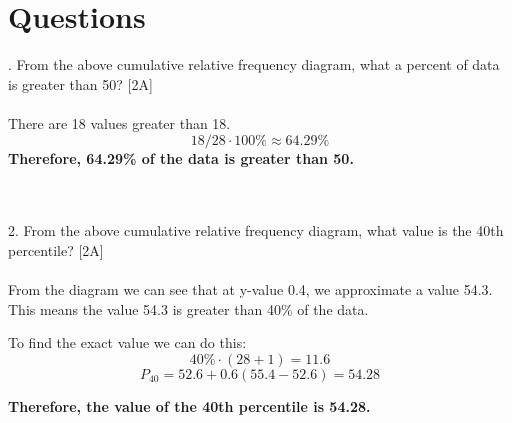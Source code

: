 \documentclass{article}
\begin{document}
\section{Questions}
. From the above cumulative relative frequency diagram, what a percent of data is greater than 50? [2A]
\\
\\
There are 18 values greater than 18.
\[18/28 \cdot 100\% \approx 64.29\%\]
\textbf{Therefore, 64.29\% of the data is greater than 50.}

\\
\\
2. From the above cumulative relative frequency diagram, what value is the 40th percentile?  [2A]
\\
\\
From the diagram we can see that at y-value 0.4, we approximate a value 54.3. This means the value 54.3 is greater than 40\% of the data.

To find the exact value we can do this:
\[40\% \cdot (28 + 1) = 11.6\]
\[P_{40} = 52.6 + 0.6(55.4-52.6) = 54.28\]

\textbf{Therefore, the value of the 40th percentile is 54.28.}
\end{document}
